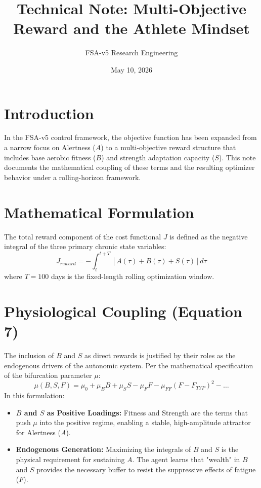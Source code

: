\documentclass[11pt,a4paper]{article}
\title{Technical Note: Multi-Objective Reward and the Athlete Mindset}
\author{FSA-v5 Research Engineering}
\date{May 10, 2026}
\begin{document}
\maketitle

\section{Introduction}
In the FSA-v5 control framework, the objective function has been expanded from a narrow focus on Alertness ($A$) to a multi-objective reward structure that includes base aerobic fitness ($B$) and strength adaptation capacity ($S$). This note documents the mathematical coupling of these terms and the resulting optimizer behavior under a rolling-horizon framework.

\section{Mathematical Formulation}
The total reward component of the cost functional $J$ is defined as the negative integral of the three primary chronic state variables:
\begin{equation}
    J_{reward} = - \int_{t}^{t+T} \left[ A(\tau) + B(\tau) + S(\tau) \right] d\tau
\end{equation}
where $T = 100$ days is the fixed-length rolling optimization window.

\section{Physiological Coupling (Equation 7)}
The inclusion of $B$ and $S$ as direct rewards is justified by their roles as the endogenous drivers of the autonomic system. Per the mathematical specification of the bifurcation parameter $\mu$:
\begin{equation}
    \mu(B, S, F) = \mu_0 + \mu_B B + \mu_S S - \mu_F F - \mu_{FF} (F - F_{TYP})^2 - \dots
\end{equation}
In this formulation:
\begin{itemize}
    \item \textbf{$B$ and $S$ as Positive Loadings:} Fitness and Strength are the terms that push $\mu$ into the positive regime, enabling a stable, high-amplitude attractor for Alertness ($A$).
    \item \textbf{Endogenous Generation:} Maximizing the integrals of $B$ and $S$ is the physical requirement for sustaining $A$. The agent learns that "wealth" in $B$ and $S$ provides the necessary buffer to resist the suppressive effects of fatigue ($F$).
\end{itemize}
\end{document}
